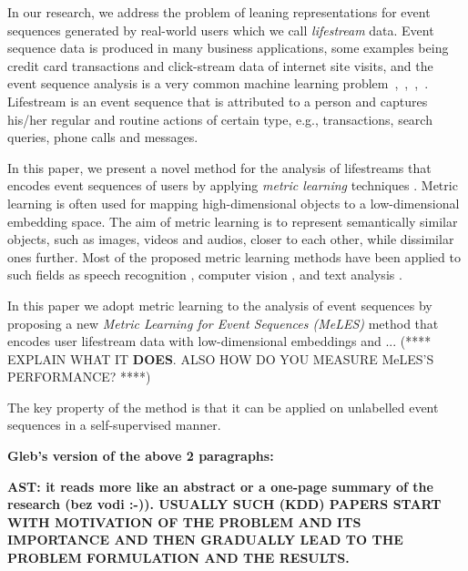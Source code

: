 \documentclass[sigconf, anonymous]{acmart}
\begin{document}
In our research, we address the problem of leaning representations for event sequences generated by real-world users which we call \emph{lifestream} data. Event sequence data is produced in many business applications, some examples being credit card transactions and click-stream data of internet site visits, and the event sequence analysis is a very common machine learning problem~\cite{laxman2008stream},~\cite{wiese2009credit},~\cite{zhang2017credit},~\cite{bigon2019prediction}. Lifestream is an event sequence that is attributed to a person and captures his/her regular and routine actions of certain type, e.g., transactions, search queries, phone calls and messages.

In this paper, we present a novel method for the analysis of lifestreams that encodes event sequences of users by applying \emph{metric learning} techniques \cite{Hadsell:2006:DRL:1153171.1153654}.
Metric learning is often used for mapping high-dimensional objects to a low-dimensional embedding space. The aim of metric learning is to represent semantically similar objects, such as images, videos and audios, closer to each other, while dissimilar ones further. Most of the proposed metric learning methods have been applied to such fields as speech recognition \cite{wan2017generalized}, computer vision \cite{Schroff2015FaceNetAU}, \cite{Mao2019AdvRobust} and text analysis \cite{reimers-2019-sentence-bert}. 

In this paper we adopt metric learning to the analysis of event sequences by proposing a new \emph{Metric Learning for Event Sequences (MeLES)} method that encodes user lifestream data with low-dimensional embeddings and ... (**** EXPLAIN WHAT IT \textbf{DOES}. ALSO HOW DO YOU MEASURE MeLES'S PERFORMANCE? ****) 

The key property of the method is that it can be applied on unlabelled event sequences in a self-supervised manner.

{\bf Gleb's version of the above 2 paragraphs:}

{\bf AST: it reads more like an abstract or a one-page summary of the research (bez vodi :-)). USUALLY SUCH (KDD) PAPERS START WITH MOTIVATION OF THE PROBLEM AND ITS IMPORTANCE AND THEN GRADUALLY LEAD TO THE PROBLEM FORMULATION AND THE RESULTS.}
\end{document}
